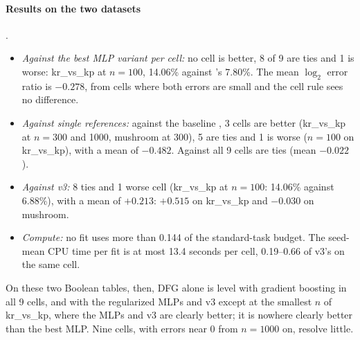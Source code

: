 \paragraph{Results on the two datasets} .
\begin{itemize}
\item \emph{Against the best MLP variant per cell:} no cell is better, 8 of 9 are ties and 1 is worse: kr\_vs\_kp at $n=100$, 14.06\% against 's 7.80\%. The mean $\log_2$ error ratio is $-0.278$, from cells where both errors are small and the cell rule sees no difference.
\item \emph{Against single references:} against the baseline , 3 cells are better (kr\_vs\_kp at $n=300$ and 1000, mushroom at 300), 5 are ties and 1 is worse ($n=100$ on kr\_vs\_kp), with a mean of $-0.482$. Against  all 9 cells are ties (mean $-0.022$).
\item \emph{Against v3:} 8 ties and 1 worse cell (kr\_vs\_kp at $n=100$: 14.06\% against 6.88\%), with a mean of $+0.213$: $+0.515$ on kr\_vs\_kp and $-0.030$ on mushroom.
\item \emph{Compute:} no fit uses more than 0.144 of the standard-task budget. The seed-mean CPU time per fit is at most 13.4 seconds per cell, 0.19--0.66 of v3's on the same cell.
\end{itemize}
On these two Boolean tables, then, DFG alone is level with gradient boosting in all 9 cells, and with the regularized MLPs and v3 except at the smallest $n$ of kr\_vs\_kp, where the MLPs and v3 are clearly better; it is nowhere clearly better than the best MLP. Nine cells, with errors near 0 from $n=1000$ on, resolve little.


